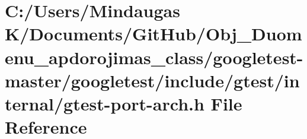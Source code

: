 \hypertarget{googletest-master_2googletest_2include_2gtest_2internal_2gtest-port-arch_8h}{}\section{C\+:/\+Users/\+Mindaugas K/\+Documents/\+Git\+Hub/\+Obj\+\_\+\+Duomenu\+\_\+apdorojimas\+\_\+class/googletest-\/master/googletest/include/gtest/internal/gtest-\/port-\/arch.h File Reference}
\label{googletest-master_2googletest_2include_2gtest_2internal_2gtest-port-arch_8h}
